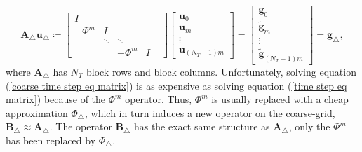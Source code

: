 \documentclass[VANCOUVER,STIX1COL]{WileyNJD-v2}
\begin{document}
\begin{equation}\label{coarse time step eq matrix}
\mathbf{A_{\triangle} u_{\triangle}} \coloneqq  
\begin{bmatrix} 
I &  &  &  & \\
-\Phi^m & I &  &  &\\
& \ddots &  \ddots&  & \\
& & -\Phi^m & I
\end{bmatrix}
\begin{bmatrix}
\mathbf{u}_0\\ \mathbf{u}_m \\ \vdots \\ \mathbf{u}_{(N_T-1) m}
\end{bmatrix}=
\begin{bmatrix}
\mathbf{g}_0\\ \tilde{\mathbf{g}}_m \\ \vdots \\ \tilde{\mathbf{g}}_{(N_T-1) m}
\end{bmatrix} = \mathbf{g}_{\triangle},
\end{equation}
\normalsize
 where $\mathbf{A_{\triangle}}$ has $N_T$ block rows and block columns. Unfortunately, solving equation (\ref{coarse time step eq matrix}) is as expensive as solving equation (\ref{time step eq matrix}) because of the $\Phi^m$ operator.  Thus, $\Phi^m$ is usually replaced with a cheap approximation $\Phi_{\triangle}$, which in turn induces  a new operator on the coarse-grid, $\mathbf{B}_{\triangle} \approx \mathbf{A}_{\triangle}$.  The operator $\mathbf{B}_\triangle$ has the exact same structure as $\mathbf{A}_\triangle$, only the $\Phi^m$ has been replaced by $\Phi_\triangle$.
\end{document}
